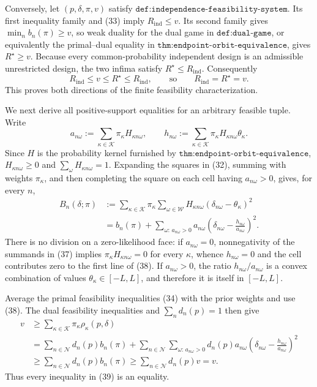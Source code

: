 Conversely, let \((p,\delta,\pi,v)\) satisfy \(\texttt{def:independence-feasibility-system}\).  Its first inequality family and (33) imply \(R_{\mathrm{ind}}\le v\).  Its second family gives \(\min_n b_n(\pi)\ge v\), so weak duality for the dual game in \(\texttt{def:dual-game}\), or equivalently the primal--dual equality in \(\texttt{thm:endpoint-orbit-equivalence}\), gives \(R^\star\ge v\).  Because every common-probability independent design is an admissible unrestricted design, the two infima satisfy \(R^\star\le R_{\mathrm{ind}}\).  Consequently
\[
 R_{\mathrm{ind}}\le v\le R^\star\le R_{\mathrm{ind}},
 \qquad \text{so}\qquad
 R_{\mathrm{ind}}=R^\star=v.                                               \tag{36}
\]
This proves both directions of the finite feasibility characterization.

We next derive all positive-support equalities for an arbitrary feasible tuple.  Write
\[
 a_{n\omega}:=\sum_{\kappa\in\mathcal K}
                  \pi_\kappa H_{\kappa n\omega},
 \qquad
 h_{n\omega}:=\sum_{\kappa\in\mathcal K}
                  \pi_\kappa H_{\kappa n\omega}\theta_\kappa.           \tag{37}
\]
Since \(H\) is the probability kernel furnished by \(\texttt{thm:endpoint-orbit-equivalence}\), \(H_{\kappa n\omega}\ge0\) and \(\sum_\omega H_{\kappa n\omega}=1\).  Expanding the squares in (32), summing with weights \(\pi_\kappa\), and then completing the square on each cell having \(a_{n\omega}>0\), gives, for every \(n\),
\[
\begin{aligned}
 B_n(\delta;\pi)
 &:=\sum_{\kappa\in\mathcal K}\pi_\kappa
       \sum_{\omega\in\mathcal W}H_{\kappa n\omega}
       (\delta_{n\omega}-\theta_\kappa)^2 \\
 &= b_n(\pi)
   +\sum_{\omega:\,a_{n\omega}>0}a_{n\omega}
      \left(\delta_{n\omega}-\frac{h_{n\omega}}{a_{n\omega}}\right)^2.
\end{aligned}                                                               \tag{38}
\]
There is no division on a zero-likelihood face: if \(a_{n\omega}=0\), nonnegativity of the summands in (37) implies
\(\pi_\kappa H_{\kappa n\omega}=0\) for every \(\kappa\), whence \(h_{n\omega}=0\) and the cell contributes zero to the first line of (38).  If \(a_{n\omega}>0\), the ratio \(h_{n\omega}/a_{n\omega}\) is a convex combination of values \(\theta_\kappa\in[-L,L]\), and therefore it is itself in \([-L,L]\).

Average the primal feasibility inequalities (34) with the prior weights and use (38).  The dual feasibility inequalities and \(\sum_n d_n(p)=1\) then give
\[
\begin{aligned}
 v
 &\ge \sum_{\kappa\in\mathcal K}\pi_\kappa
          \rho_\kappa(p,\delta) \\
 &=\sum_{n\in\mathcal N}d_n(p)b_n(\pi)
   +\sum_{n\in\mathcal N}\sum_{\omega:\,a_{n\omega}>0}
       d_n(p)a_{n\omega}
       \left(\delta_{n\omega}-\frac{h_{n\omega}}{a_{n\omega}}\right)^2 \\
 &\ge\sum_{n\in\mathcal N}d_n(p)b_n(\pi)
 \ge\sum_{n\in\mathcal N}d_n(p)v=v.
\end{aligned}                                                               \tag{39}
\]
Thus every inequality in (39) is an equality.

